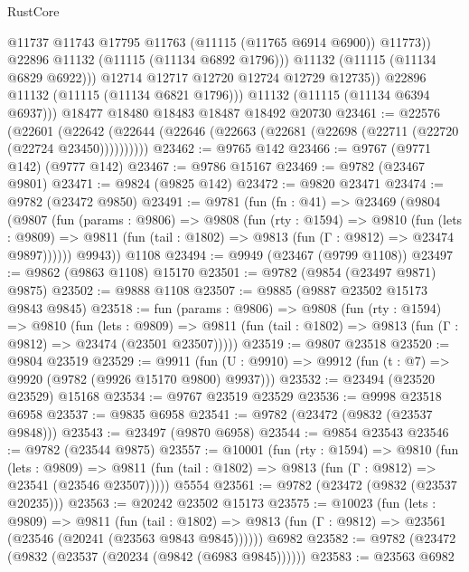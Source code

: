 \begin{lexlean}{RustCore}
\begin{coremodule}
                    @11737
                    @11743
                    @17795
                    @11763
                    (@11115 (@11765 @6914 @6900))
                    @11773))
                @22896
                @11132
                (@11115 (@11134 @6892 @1796)))
              @11132
              (@11115 (@11134 @6829 @6922)))
            @12714
            @12717
            @12720
            @12724
            @12729
            @12735))
        @22896
        @11132
        (@11115 (@11134 @6821 @1796)))
      @11132
      (@11115 (@11134 @6394 @6937)))
    @18477
    @18480
    @18483
    @18487
    @18492
    @20730
@23461 := @22576
    (@22601 (@22642 (@22644 (@22646 (@22663 (@22681 (@22698 (@22711 (@22720 (@22724 @23450))))))))))
@23462 := @9765 @142
@23466 := @9767 (@9771 @142) (@9777 @142)
@23467 := @9786 @15167
@23469 := @9782 (@23467 @9801)
@23471 := @9824 (@9825 @142)
@23472 := @9820 @23471
@23474 := @9782 (@23472 @9850)
@23491 := @9781
    (fun (fn : @41) =>
    @23469
      (@9804
        (@9807
          (fun (params : @9806) =>
          @9808
            (fun (rty : @1594) =>
            @9810
              (fun (lets : @9809) =>
              @9811 (fun (tail : @1802) => @9813 (fun (Γ : @9812) => @23474 @9897))))))
        @9943))
    @1108
@23494 := @9949 (@23467 (@9799 @1108))
@23497 := @9862 (@9863 @1108) @15170
@23501 := @9782 (@9854 (@23497 @9871) @9875)
@23502 := @9888 @1108
@23507 := @9885 (@9887 @23502 @15173 @9843 @9845)
@23518 := fun (params : @9806) =>
  @9808
    (fun (rty : @1594) =>
    @9810
      (fun (lets : @9809) =>
      @9811 (fun (tail : @1802) => @9813 (fun (Γ : @9812) => @23474 (@23501 @23507)))))
@23519 := @9807 @23518
@23520 := @9804 @23519
@23529 := @9911
    (fun (U : @9910) => @9912 (fun (t : @7) => @9920 (@9782 (@9926 @15170 @9800) @9937)))
@23532 := @23494 (@23520 @23529) @15168
@23534 := @9767 @23519 @23529
@23536 := @9998 @23518 @6958
@23537 := @9835 @6958
@23541 := @9782 (@23472 (@9832 (@23537 @9848)))
@23543 := @23497 (@9870 @6958)
@23544 := @9854 @23543
@23546 := @9782 (@23544 @9875)
@23557 := @10001
    (fun (rty : @1594) =>
    @9810
      (fun (lets : @9809) =>
      @9811 (fun (tail : @1802) => @9813 (fun (Γ : @9812) => @23541 (@23546 @23507)))))
    @5554
@23561 := @9782 (@23472 (@9832 (@23537 @20235)))
@23563 := @20242 @23502 @15173
@23575 := @10023
    (fun (lets : @9809) =>
    @9811
      (fun (tail : @1802) =>
      @9813 (fun (Γ : @9812) => @23561 (@23546 (@20241 (@23563 @9843 @9845))))))
    @6982
@23582 := @9782 (@23472 (@9832 (@23537 (@20234 (@9842 (@6983 @9845))))))
@23583 := @23563 @6982

\end{coremodule}
\end{lexlean}
